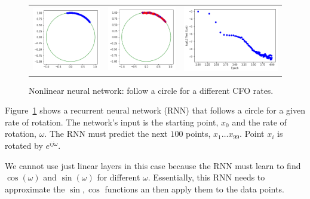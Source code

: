 \setlength{\tabcolsep}{0pt}
\begin{figure}
  \centering
  \caption{Nonlinear neural network: follow a circle for a different CFO rates.}
  \begin{tabular}{ccc}
    \includegraphics[width=50mm]{figures/cfo/follow_circle_nonlinear_before.png}&
    \includegraphics[width=50mm]{figures/cfo/follow_circle_nonlinear_after.png}&
    \includegraphics[width=70mm]{figures/cfo/follow_circle_nonlinear_loss.png}\\
  \end{tabular}
  \label{fig:circle_diff_rate}
\end{figure}

Figure~\ref{fig:circle_diff_rate} shows a recurrent neural network (RNN) that follows a circle for a given rate of rotation.
The network's input is the starting point, $x_0$ and the rate of rotation, $\omega$.
The RNN must predict the next $100$ points, $x_1 \ldots x_{99}$.  Point $x_i$ is rotated by $e^{ij\omega}$.

We cannot use just linear layers in this case because the RNN must learn to find $\cos(\omega)$ and $\sin(\omega)$ for different $\omega$.  Essentially, this RNN needs to approximate the $\sin, \cos$ functions an then apply them to the data points.

